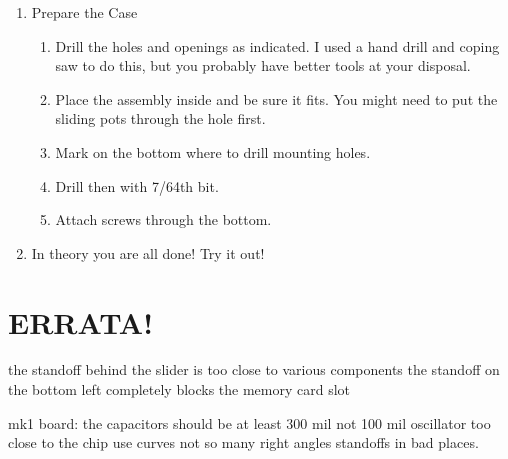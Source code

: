 \documentclass[11pt]{article}
\begin{document}
\begin{enumerate}
\begin{enumerate}
		\end{enumerate}

	\item Prepare the Case
		\begin{enumerate}
		\item	Drill the holes and openings as indicated.
			I used a hand drill and coping saw to do this, but you
			probably have better tools at your disposal.
		\item Place the assembly inside and be sure it fits.
			You might need to put the sliding pots through the hole first.
		\item Mark on the bottom where to drill mounting holes.
		\item Drill then with 7/64th bit.
		\item Attach screws through the bottom.
		\end{enumerate}

	\item In theory you are all done!  Try it out!

\end{enumerate}


\section{ERRATA!}

the standoff behind the slider is too close to various components
the standoff on the bottom left completely blocks the memory card slot

mk1 board:
the capacitors should be at least 300 mil not 100 mil
oscillator too close to the chip
use curves not so many right angles
standoffs in bad places.
\end{document}
